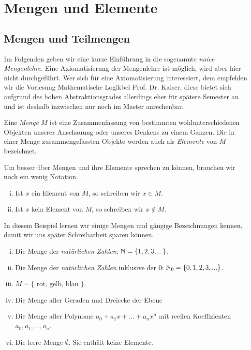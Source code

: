 \chapter{Mengen und Elemente}

\section{Mengen und Teilmengen}
Im Folgenden geben wir eine kurze Einführung in die sogenannte
\textit{naive Mengenlehre}.
Eine Axiomatisierung der Mengenlehre ist möglich, wird aber hier nicht
durchgeführt.
Wer sich für eine Axiomatisierung interessiert, dem empfehlen wir die Vorlesung
\glqq Mathematische Logik\grqq bei Prof. Dr. Kaiser, diese bietet sich aufgrund
des hohen Abstraktionsgrades allerdings eher für spätere Semester an und ist
deshalb inzwischen nur noch im Master anrechenbar.

\begin{mydef}
Eine \textit{Menge} $M$ ist eine Zusammenfassung von bestimmten
wohlunterschiedenen Objekten unserer Anschauung oder unseres Denkens zu einem
Ganzen.
Die in einer Menge zusammengefassten Objekte werden auch als \textit{Elemente}
von $M$ bezeichnet.
\end{mydef}

\begin{remark}
Um besser über Mengen und ihre Elemente sprechen zu können, brauchen wir noch
ein wenig Notation.
    \begin{enumerate}[(i)]
        \item
        Ist $x$ ein Element von $M$, so schreiben wir $x \in M$.
        \item
        Ist $x$ kein Element von $M$, so schreiben wir $x \notin M$.
    \end{enumerate}
\end{remark}

\begin{example}
In diesem Beispiel lernen wir einige Mengen und gängige Bezeichnungen kennen,
damit wir uns später Schreibarbeit sparen können.
    \begin{enumerate}[(i)]
        \item
        Die Menge der \textit{natürlichen Zahlen}: $\mathbb{N} = \{1,2,3,...\}$.
        \item
        Die Menge der \textit{natürlichen Zahlen} inklusive der $0$: $\mathbb{N}_0 = \{0,1,2,3,...\}$.
        \item
        $M = \{$ rot, gelb, blau $\}$.
        \item
        Die Menge aller Geraden und Dreiecke der Ebene
        \item
        Die Menge aller Polynome $a_0 + a_1 x + ... + a_n x^n$ mit reellen Koeffizienten $a_0,a_1,...,a_n$.
        \item
        Die leere Menge $\emptyset$. Sie enthält keine Elemente.
    \end{enumerate}
\end{example}

